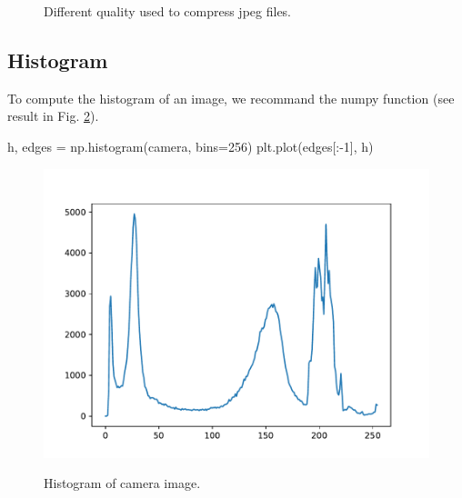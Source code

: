 \begin{figure}[H]
 \centering\caption{Different quality used to compress jpeg files.}%
 \hfill
 \hfill 
 \label{fig:introduction:python:jpeg}%
\end{figure}



\subsection{Histogram}
To compute the histogram of an image, we recommand the numpy function  (see result in Fig. \ref{fig:histo}).
\begin{python}
h, edges = np.histogram(camera, bins=256)
plt.plot(edges[:-1], h)
\end{python}
\begin{figure}[H] 
 \centering\caption{Histogram of camera image.}%
 \includegraphics[width=.8\linewidth]{histogramme.pdf}%
 \vspace*{-5pt}%
 \label{fig:histo}%
\end{figure}

